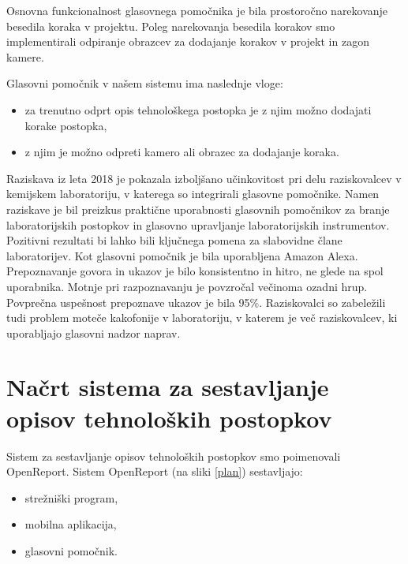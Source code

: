 \documentclass[a4paper, 12pt]{book}
\begin{document}

Osnovna funkcionalnost glasovnega pomočnika je bila prostoročno narekovanje besedila koraka v projektu.
Poleg narekovanja besedila korakov smo implementirali odpiranje obrazcev za dodajanje korakov v projekt in zagon kamere.

\bigbreak 
Glasovni pomočnik v našem sistemu ima naslednje vloge:
\begin{itemize}
	\item za trenutno odprt opis tehnološkega postopka je z njim možno dodajati korake postopka,
	\item z njim je možno odpreti kamero ali obrazec za dodajanje koraka.
\end{itemize}

Raziskava iz leta 2018 \cite{austerjost2018introducing} je pokazala izboljšano učinkovitost pri delu raziskovalcev v kemijskem laboratoriju, v katerega so integrirali glasovne pomočnike.
Namen raziskave je bil preizkus praktične uporabnosti glasovnih pomočnikov za branje laboratorijskih postopkov in glasovno upravljanje laboratorijskih instrumentov.
Pozitivni rezultati bi lahko bili ključnega pomena za slabovidne člane laboratorijev.
Kot glasovni pomočnik je bila uporabljena Amazon Alexa.
Prepoznavanje govora in ukazov je bilo konsistentno in hitro, ne glede na spol uporabnika.
Motnje pri razpoznavanju je povzročal večinoma ozadni hrup.
Povprečna uspešnost prepoznave ukazov je bila 95\%.
Raziskovalci so zabeležili tudi problem moteče kakofonije v laboratoriju, v katerem je več raziskovalcev, ki uporabljajo glasovni nadzor naprav.

\section{Načrt sistema za sestavljanje opisov tehnoloških postopkov}



Sistem za sestavljanje opisov tehnoloških postopkov smo poimenovali OpenReport. 
Sistem OpenReport (na sliki \ref{plan}) sestavljajo:

\begin{itemize}
	\item strežniški program, 
	\item mobilna aplikacija,
	\item glasovni pomočnik.
\end{itemize}
\end{document}
